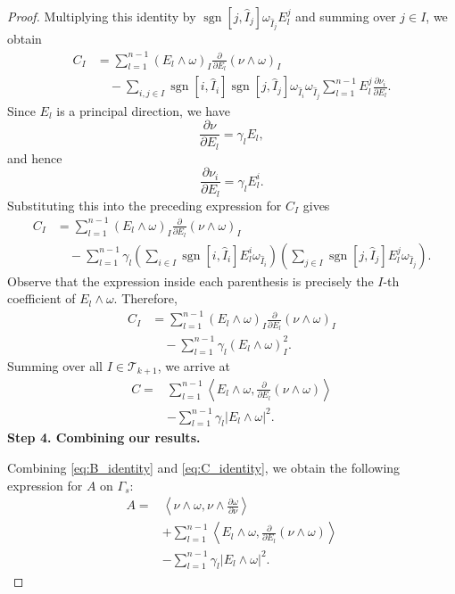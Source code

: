 \begin{proof}
Multiplying this identity by
$\operatorname{sgn}[j,\widehat I_j]\omega_{\widehat I_j}E_l^j$
and summing over $j\in I$, we obtain
\[
\begin{aligned}
C_I
&=
\sum_{l=1}^{n-1}
( E_l\wedge\omega )_I
\frac{\partial}{\partial E_l}
(\nu\wedge\omega)_I
\\
&\quad-
\sum_{i,j\in I}
\operatorname{sgn}[i,\widehat I_i]
\operatorname{sgn}[j,\widehat I_j]
\omega_{\widehat I_i}
\omega_{\widehat I_j}
\sum_{l=1}^{n-1}
E_l^j
\frac{\partial\nu_i}{\partial E_l}.
\end{aligned}
\]
Since $E_l$ is a principal direction, we have
\[
\frac{\partial\nu}{\partial E_l}
=
\gamma_lE_l,
\]
and hence
\[
\frac{\partial\nu_i}{\partial E_l}
=
\gamma_lE_l^i.
\]
Substituting this into the preceding expression for $C_I$ gives
\[
\begin{aligned}
C_I
&=
\sum_{l=1}^{n-1}
( E_l\wedge\omega )_I
\frac{\partial}{\partial E_l}
(\nu\wedge\omega)_I
\\
&\quad-
\sum_{l=1}^{n-1}
\gamma_l
\left(
\sum_{i\in I}
\operatorname{sgn}[i,\widehat I_i]
E_l^i
\omega_{\widehat I_i}
\right)
\left(
\sum_{j\in I}
\operatorname{sgn}[j,\widehat I_j]
E_l^j
\omega_{\widehat I_j}
\right).
\end{aligned}
\]
Observe that the expression inside each parenthesis is precisely
the $I$-th coefficient of $E_l\wedge\omega$. Therefore,
\[
\begin{aligned}
C_I
&=
\sum_{l=1}^{n-1}
( E_l\wedge\omega )_I
\frac{\partial}{\partial E_l}
(\nu\wedge\omega)_I
\\
&\quad-
\sum_{l=1}^{n-1}
\gamma_l
( E_l\wedge\omega )_I^2.
\end{aligned}
\]
Summing over all $I\in\mathscr{T}_{k+1}$, we arrive at
\begin{equation}
\label{eq:C_identity}
\begin{aligned}
C={}&
\sum_{l=1}^{n-1}
\left\langle
E_l\wedge\omega,
\frac{\partial}{\partial E_l}
(\nu\wedge\omega)
\right\rangle
\\
&-
\sum_{l=1}^{n-1}
\gamma_l|E_l\wedge\omega|^2.
\end{aligned}
\end{equation}
\textbf{Step 4. Combining our results.}

Combining \eqref{eq:B_identity} and \eqref{eq:C_identity}, we obtain
the following expression for $A$ on $\Gamma_s$:
\[
\begin{aligned}
A={}&
\left\langle
\nu\wedge\omega,
\nu\wedge\frac{\partial\omega}{\partial\nu}
\right\rangle
\\
&+
\sum_{l=1}^{n-1}
\left\langle
E_l\wedge\omega,
\frac{\partial}{\partial E_l}
(\nu\wedge\omega)
\right\rangle
\\
&-
\sum_{l=1}^{n-1}
\gamma_l|E_l\wedge\omega|^2.
\end{aligned}
\]


\end{proof}

